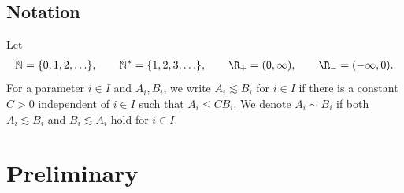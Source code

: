 \subsection{Notation}
Let
\begin{align*}
\mathbb{N}=\{0,1,2,\hdots\},\qquad \mathbb{N}^*=\{1,2,3,\hdots\}, \qquad \R_{+}=(0,\infty),\qquad \R_-=(-\infty,0).
\end{align*}
For a parameter $i\in I$ and $A_i,B_i$, we write $A_i\lesssim B_i$ for $i\in I$ if there is a constant $C>0$ independent of $i\in I$ such that $A_i\leq CB_i$. We denote $A_i\sim B_i$ if both $A_i\lesssim B_i$ and $B_i\lesssim A_i$ hold for $i\in I$.

\section{Preliminary}
